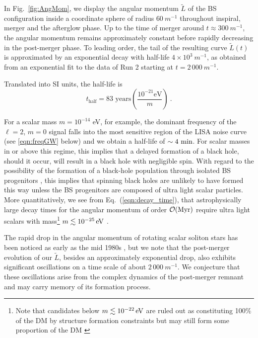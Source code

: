 \documentclass[aps,twocolumn,nofootinbib,superscriptaddress,amsfonts,floatfix
]{revtex4-1} %
\begin{document}
In Fig.~\ref{fig:AngMom}, we display
the angular momentum $\tilde{L}$ of the BS configuration
inside a coordinate sphere of radius $60~m^{-1}$ throughout
inspiral, merger and the afterglow phase. Up to the time
of merger around $t\approx 300~m^{-1}$, the angular momentum
remains approximately constant before rapidly decreasing
in the post-merger phase. To leading order,
the tail of the resulting curve
$\tilde{L}(t)$ is approximated by an exponential decay with
half-life $4\times10^3~m^{-1}$, as obtained from an exponential
fit to the data of Run 2 starting at $t=2\,000~m^{-1}$.


Translated into SI units, the half-life is
\begin{equation}
    t_{\text{half}} = 83 \text{ years}  \left(\frac{10^{-21}
    \text{eV}}{m}\right)~\label{eqn:decay_time}.
\end{equation}


%
For a scalar mass $m =  10^{-14}$ eV, for example,
the dominant frequency of the $\ell=2$, $m=0$ signal
falls into the most sensitive region of the LISA noise curve (see \cref{eqn:freqGW} below) and we obtain a half-life of $\sim4~{\rm min}$. For scalar masses in or above this regime, this implies
that a delayed formation of a black hole, should it occur,
will result in a black hole with negligible spin. With regard to
the possibility of the formation of a black-hole population
through isolated BS progenitors
\cite{Helfer:2016ljl,Muia:2019coe}, this implies that
spinning black holes are unlikely to have formed this way unless
the BS progenitors are composed of ultra light scalar particles.
More quantitatively, we see from
Eq.~(\ref{eqn:decay_time}), that
astrophysically large decay times for the angular momentum
of order
$\mathcal{O}({\rm Myr})$ require ultra light
scalars with mass\footnote{Note that candidates below $m\lesssim 10^{-22}\,{\rm eV}$ are ruled out as constituting 100\% of the DM by structure formation constraints but may still form some proportion of the DM \cite{Marsh:2015xka}}
$m\lesssim 10^{-25}\,{\rm eV}$ .

The rapid drop in the angular momentum of rotating
scalar soliton stars has been noticed as early as the mid 1980s
\cite{Lee:1986ts,Friedberg:1986tq},
but we note that the post-merger evolution of our $\tilde{L}$,
besides an approximately exponential drop, also exhibits
significant oscillations on a time scale of about
$2\,000~m^{-1}$. We conjecture that these oscillations
arise from the complex dynamics of the post-merger remnant
and may carry memory of its formation process.
\end{document}
